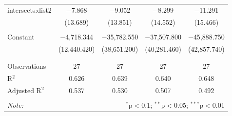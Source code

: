 \begin{table}[!htbp]
\begin{tabular}{@{\extracolsep{-5pt}}lcccc}
 intersects:dist2 & $-$7.868 & $-$9.052 & $-$8.299 & $-$11.291 \\ 
  & (13.689) & (13.851) & (14.552) & (15.466) \\ 
  & & & & \\ 
 Constant & $-$4,718.344 & $-$35,782.550 & $-$37,507.800 & $-$45,888.750 \\ 
  & (12,440.420) & (38,651.200) & (40,281.460) & (42,857.740) \\ 
  & & & & \\ 
\hline \\[-1.8ex] 
Observations & 27 & 27 & 27 & 27 \\ 
R$^{2}$ & 0.626 & 0.639 & 0.640 & 0.648 \\ 
Adjusted R$^{2}$ & 0.537 & 0.530 & 0.507 & 0.492 \\ 
\hline 
\hline \\[-1.8ex] 
\textit{Note:}  & \multicolumn{4}{r}{$^{*}$p$<$0.1; $^{**}$p$<$0.05; $^{***}$p$<$0.01} \\ 
\end{tabular} 
\end{table} 
